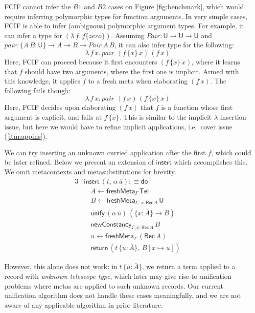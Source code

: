\documentclass[acmsmall,screen,dvipsnames]{acmart}\settopmatter{}
\renewcommand{\U}{\mathsf{U}}
\newcommand{\unify}{\mathsf{unify}}
\newcommand{\mi}[1]{\mathit{#1}}
\newcommand{\edo}{\boldsymbol{\mathsf{do}}}
\newcommand{\ereturn}{\boldsymbol{\mathsf{return}}}
\newcommand{\einsert}{\mathsf{insert}}
\newcommand{\Tel}{\mathsf{Tel}}
\newcommand{\Rec}{\mathsf{Rec}}
\newcommand{\ol}[1]{\overline{#1}}
\theoremstyle{remark}
\begin{document}
FCIF cannot infer the $B1$ and $B2$ cases on Figure \ref{fig:benchmark}, which
would require inferring polymorphic types for function arguments. In very simple
cases, FCIF is able to infer (ambiguous) polymorphic argument types. For
example, it can infer a type for $(\lambda\,f.\,f\{\mi{zero}\})$. Assuming
$\mi{Pair} : \U \to \U \to \U$ and $\mi{pair}: \{A\,B : \U\}\to A \to B \to
\mi{Pair}\,A\,B$, it can also infer type for the following:
\[
    \lambda\,f\,x.\,\mi{pair}\,\,(f\,\{x\}\,x)\,(f\,x)
\]
Here, FCIF can proceed because it first encounters $(f\,\{x\}\,x)$, where it
learns that $f$ should have two arguments, where the first one is implicit.
Armed with this knowledge, it applies $f$ to a fresh meta when elaborating
$(f\,x)$. The following fails though:
\[
    \lambda\,f\,x.\,\mi{pair}\,\,(f\,x)\,(f\,\{x\}\,x)
\]
Here, FCIF decides upon elaborating $(f\,x)$ that $f$ is a function whose first
argument is explicit, and fails at $f\,\{x\}$. This is similar to the implicit
$\lambda$ insertion issue, but here we would have to refine implicit
applications, i.e.\ cover issue (\ref{itm:appins}).

We can try inserting an unknown curried application after the first $f$, which
could be later refined. Below we present an extension of $\einsert$ which
accomplishes this. We omit metacontexts and metasubstitutions for brevity.
\begin{alignat*}{3}
& \einsert\,(t,\,\alpha\,\ol{u}) :\equiv \edo \\
& \quad A \leftarrow \mathsf{freshMeta}_{\Gamma}\,\Tel\\
& \quad B \leftarrow \mathsf{freshMeta}_{\Gamma,\,x: \Rec\,A}\,\U\\
& \quad \unify\,(\alpha\,\ol{u})\,(\{x : \ol{A}\} \to B)\\
& \quad \mathsf{newConstancy}_{\Gamma, x : \Rec\,A}\,B\\
& \quad u \leftarrow \mathsf{freshMeta}_{\Gamma}\,(\Rec\,A)\\
& \quad \ereturn\,(t\,\{u : \ol{A}\},\,B[x \mapsto u])
\end{alignat*}

However, this alone does not work: in $t\,\{u : \ol{A}\}$, we return a term
applied to a record with \emph{unknown telescope type}, which later may give
rise to unification problems where metas are applied to such unknown records.
Our current unification algorithm does not handle these cases meaningfully, and
we are not aware of any applicable algorithm in prior literature.
\end{document}
